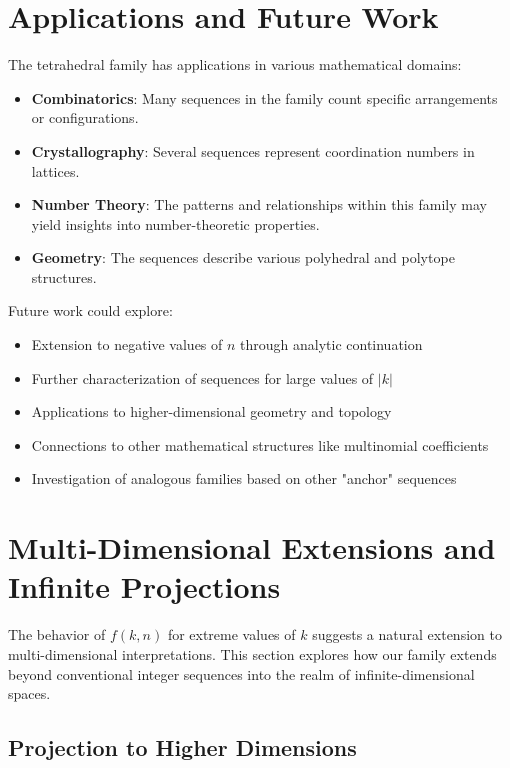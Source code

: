 \documentclass[12pt,a4paper]{article}
\begin{document}
\section{Applications and Future Work}

The tetrahedral family has applications in various mathematical domains:

\begin{itemize}
    \item \textbf{Combinatorics}: Many sequences in the family count specific arrangements or configurations.
    \item \textbf{Crystallography}: Several sequences represent coordination numbers in lattices.
    \item \textbf{Number Theory}: The patterns and relationships within this family may yield insights into number-theoretic properties.
    \item \textbf{Geometry}: The sequences describe various polyhedral and polytope structures.
\end{itemize}

Future work could explore:

\begin{itemize}
    \item Extension to negative values of $n$ through analytic continuation
    \item Further characterization of sequences for large values of $|k|$
    \item Applications to higher-dimensional geometry and topology
    \item Connections to other mathematical structures like multinomial coefficients
    \item Investigation of analogous families based on other "anchor" sequences
\end{itemize}

\section{Multi-Dimensional Extensions and Infinite Projections}

The behavior of $f(k,n)$ for extreme values of $k$ suggests a natural extension to multi-dimensional interpretations. This section explores how our family extends beyond conventional integer sequences into the realm of infinite-dimensional spaces.

\subsection{Projection to Higher Dimensions}
\end{document}
